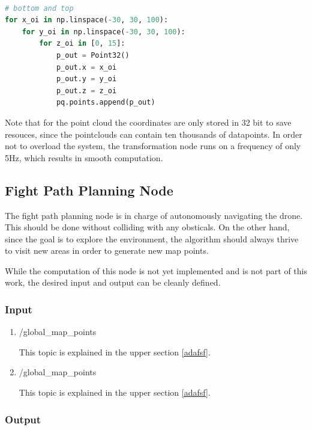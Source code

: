 	\begin{lstlisting}[language=python, caption=Adding upper and lower restrictions to pointcloud. , label=lst:const]
	
# bottom and top 
for x_oi in np.linspace(-30, 30, 100): 
	for y_oi in np.linspace(-30, 30, 100): 
		for z_oi in [0, 15]: 
			p_out = Point32()
			p_out.x = x_oi
			p_out.y = y_oi
			p_out.z = z_oi
			pq.points.append(p_out)

	\end{lstlisting}

	Note that for the point cloud the coordinates are only stored in 32 bit to save resouces, since the pointclouds can contain ten thousands of datapoints. In order not 
	to overload the system, the transformation node runs on a frequency of only 5Hz, which results in smooth computation. 
	
	\subsection{Fight Path Planning Node}
	
	The fight path planning node is in charge of autonomously navigating the drone. This should be done without colliding with any obsticals. 
	On the other hand, since the goal is to explore the environment, the algorithm should always thrive to visit new areas in order to generate 
	new map points. 
	
	While the computation of this node is not yet implemented and is not part of this work, the desired input and output can be cleanly defined.
	
	\subsubsection{Input}
	
	\begin{enumerate}
	\item{/global\_map\_points}
	
	This topic is explained in the upper section \ref{adafsf}. 
	
	\item{/global\_map\_points}
	
	This topic is explained in the upper section \ref{adafsf}.
	
	
	\end{enumerate}
	
	\subsubsection{Output}
	

